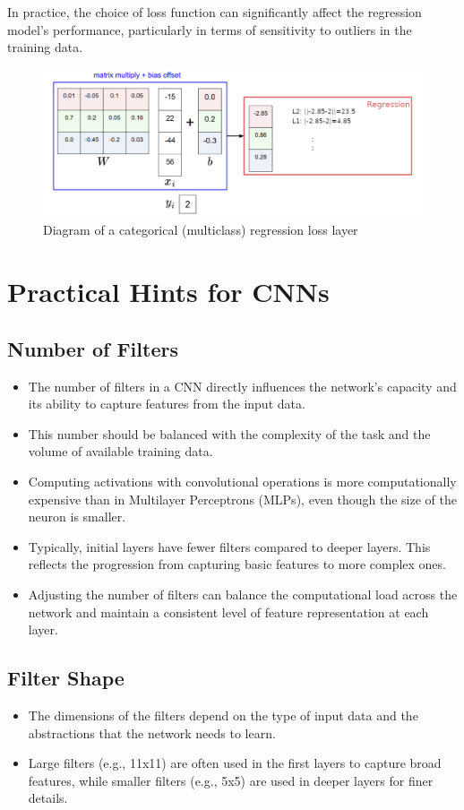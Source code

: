 In practice, the choice of loss function can significantly affect the regression model's performance, particularly in terms of sensitivity to outliers in the training data.
\begin{figure}[H]
    \centering
    \includegraphics[width=1\linewidth]{img/losslayer-regression.png}
    \caption{Diagram of a categorical (multiclass) regression loss layer }
\end{figure}


\section{Practical Hints for CNNs}

\subsection*{Number of Filters}
\begin{itemize}
    \item The number of filters in a CNN directly influences the network's capacity and its ability to capture features from the input data.
    \item This number should be balanced with the complexity of the task and the volume of available training data.
    \item Computing activations with convolutional operations is more computationally expensive than in Multilayer Perceptrons (MLPs), even though the size of the neuron is smaller.
    \item Typically, initial layers have fewer filters compared to deeper layers. This reflects the progression from capturing basic features to more complex ones.
    \item Adjusting the number of filters can balance the computational load across the network and maintain a consistent level of feature representation at each layer.
\end{itemize}

\subsection*{Filter Shape}
\begin{itemize}
    \item The dimensions of the filters depend on the type of input data and the abstractions that the network needs to learn.
    \item Large filters (e.g., 11x11) are often used in the first layers to capture broad features, while smaller filters (e.g., 5x5) are used in deeper layers for finer details.
\end{itemize}

